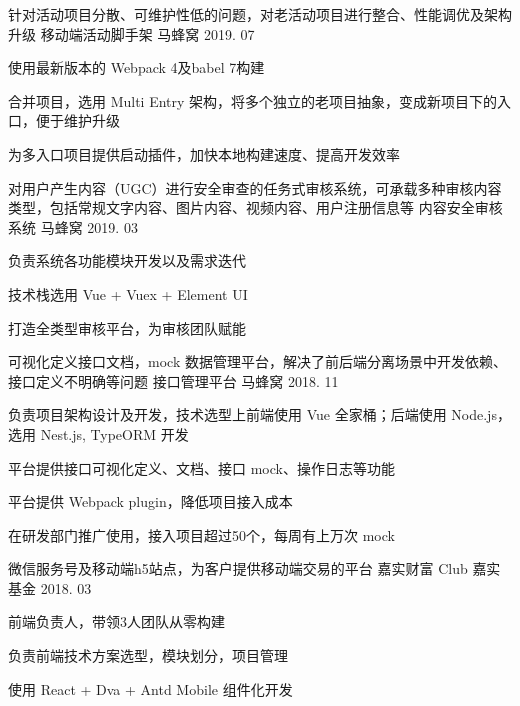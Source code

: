 \begin{cventries}
  \cventry
  {针对活动项目分散、可维护性低的问题，对老活动项目进行整合、性能调优及架构升级} %
  {移动端活动脚手架} %
  {马蜂窝} %
  {2019. 07} %
  {
    \begin{cvitems} %
      \item {使用最新版本的 Webpack 4及babel 7构建}
      \item {合并项目，选用 Multi Entry 架构，将多个独立的老项目抽象，变成新项目下的入口，便于维护升级}
      \item {为多入口项目提供启动插件，加快本地构建速度、提高开发效率}
    \end{cvitems}
  }

  \cventry
    {对用户产生内容（UGC）进行安全审查的任务式审核系统，可承载多种审核内容类型，包括常规文字内容、图片内容、视频内容、用户注册信息等} %
    {内容安全审核系统} %
    {马蜂窝} %
    {2019. 03} %
    {
      \begin{cvitems} %
        \item {负责系统各功能模块开发以及需求迭代}
        \item {技术栈选用 Vue + Vuex + Element UI}
        \item {打造全类型审核平台，为审核团队赋能}
      \end{cvitems}
    }

  \cventry
    {可视化定义接口文档，mock 数据管理平台，解决了前后端分离场景中开发依赖、接口定义不明确等问题} %
    {接口管理平台} %
    {马蜂窝} %
    {2018. 11} %
    {
      \begin{cvitems} %
        \item {负责项目架构设计及开发，技术选型上前端使用 Vue 全家桶；后端使用 Node.js，选用 Nest.js, TypeORM 开发}
        \item {平台提供接口可视化定义、文档、接口 mock、操作日志等功能}
        \item {平台提供 Webpack plugin，降低项目接入成本}
        \item {在研发部门推广使用，接入项目超过50个，每周有上万次 mock}
      \end{cvitems}
    }

  \cventry
    {微信服务号及移动端h5站点，为客户提供移动端交易的平台} %
    {嘉实财富 Club} %
    {嘉实基金} %
    {2018. 03} %
    {
      \begin{cvitems} %
        \item {前端负责人，带领3人团队从零构建}
        \item {负责前端技术方案选型，模块划分，项目管理}
        \item {使用 React + Dva + Antd Mobile 组件化开发}
      \end{cvitems}
    }

\end{cventries}
